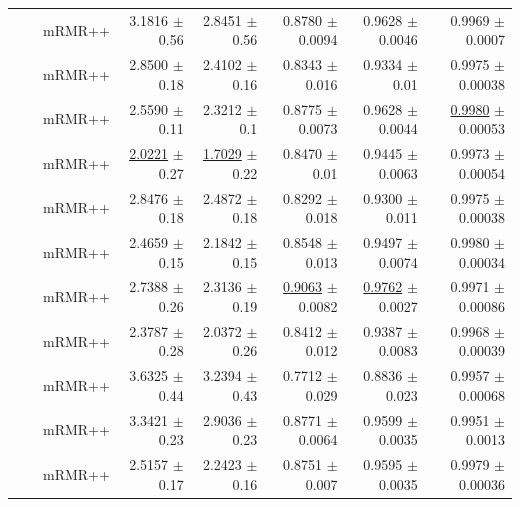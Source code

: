 \begin{longtable}{llp{}rrrrr}
 &  & mRMR++ & 3.1816 {\scriptsize $\pm$ 0.56} & 2.8451 {\scriptsize $\pm$ 0.56} & 0.8780 {\scriptsize $\pm$ 0.0094} & 0.9628 {\scriptsize $\pm$ 0.0046} & 0.9969 {\scriptsize $\pm$ 0.0007} \\
 &  & mRMR++ & 2.8500 {\scriptsize $\pm$ 0.18} & 2.4102 {\scriptsize $\pm$ 0.16} & 0.8343 {\scriptsize $\pm$ 0.016} & 0.9334 {\scriptsize $\pm$ 0.01} & 0.9975 {\scriptsize $\pm$ 0.00038} \\
 &  & mRMR++ & 2.5590 {\scriptsize $\pm$ 0.11} & 2.3212 {\scriptsize $\pm$ 0.1} & 0.8775 {\scriptsize $\pm$ 0.0073} & 0.9628 {\scriptsize $\pm$ 0.0044} & \underline{0.9980} {\scriptsize $\pm$ 0.00053} \\
 &  & mRMR++ & \underline{2.0221} {\scriptsize $\pm$ 0.27} & \underline{1.7029} {\scriptsize $\pm$ 0.22} & 0.8470 {\scriptsize $\pm$ 0.01} & 0.9445 {\scriptsize $\pm$ 0.0063} & 0.9973 {\scriptsize $\pm$ 0.00054} \\
 &  & mRMR++ & 2.8476 {\scriptsize $\pm$ 0.18} & 2.4872 {\scriptsize $\pm$ 0.18} & 0.8292 {\scriptsize $\pm$ 0.018} & 0.9300 {\scriptsize $\pm$ 0.011} & 0.9975 {\scriptsize $\pm$ 0.00038} \\
 &  & mRMR++ & 2.4659 {\scriptsize $\pm$ 0.15} & 2.1842 {\scriptsize $\pm$ 0.15} & 0.8548 {\scriptsize $\pm$ 0.013} & 0.9497 {\scriptsize $\pm$ 0.0074} & 0.9980 {\scriptsize $\pm$ 0.00034} \\
 &  & mRMR++ & 2.7388 {\scriptsize $\pm$ 0.26} & 2.3136 {\scriptsize $\pm$ 0.19} & \underline{0.9063} {\scriptsize $\pm$ 0.0082} & \underline{0.9762} {\scriptsize $\pm$ 0.0027} & 0.9971 {\scriptsize $\pm$ 0.00086} \\
 &  & mRMR++ & 2.3787 {\scriptsize $\pm$ 0.28} & 2.0372 {\scriptsize $\pm$ 0.26} & 0.8412 {\scriptsize $\pm$ 0.012} & 0.9387 {\scriptsize $\pm$ 0.0083} & 0.9968 {\scriptsize $\pm$ 0.00039} \\
 &  & mRMR++ & 3.6325 {\scriptsize $\pm$ 0.44} & 3.2394 {\scriptsize $\pm$ 0.43} & 0.7712 {\scriptsize $\pm$ 0.029} & 0.8836 {\scriptsize $\pm$ 0.023} & 0.9957 {\scriptsize $\pm$ 0.00068} \\
 &  & mRMR++ & 3.3421 {\scriptsize $\pm$ 0.23} & 2.9036 {\scriptsize $\pm$ 0.23} & 0.8771 {\scriptsize $\pm$ 0.0064} & 0.9599 {\scriptsize $\pm$ 0.0035} & 0.9951 {\scriptsize $\pm$ 0.0013} \\
 &  & mRMR++ & 2.5157 {\scriptsize $\pm$ 0.17} & 2.2423 {\scriptsize $\pm$ 0.16} & 0.8751 {\scriptsize $\pm$ 0.007} & 0.9595 {\scriptsize $\pm$ 0.0035} & 0.9979 {\scriptsize $\pm$ 0.00036} \\

\end{longtable}
